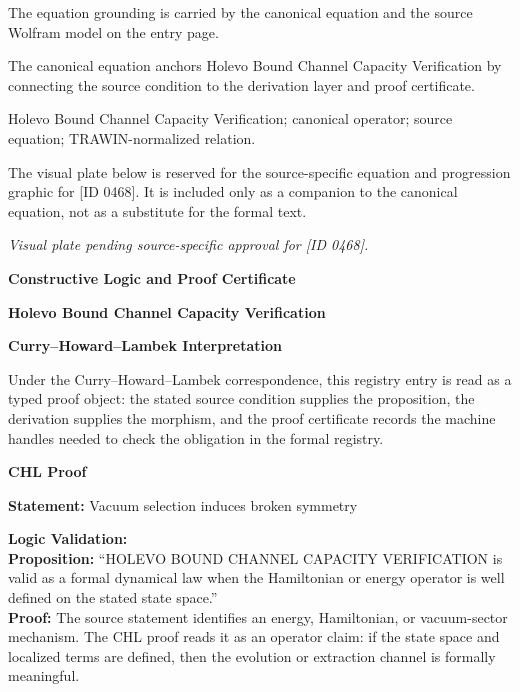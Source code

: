 The equation grounding is carried by the canonical equation and the source Wolfram model on the entry page.

The canonical equation anchors Holevo Bound Channel Capacity Verification by connecting the source condition to the derivation layer and proof certificate.

Holevo Bound Channel Capacity Verification; canonical operator; source equation; TRAWIN-normalized relation.
\endgroup

\begingroup\footnotesize\sloppy
The visual plate below is reserved for the source-specific equation and progression graphic for [ID 0468]. It is included only as a companion to the canonical equation, not as a substitute for the formal text.
\par\endgroup
\begingroup\footnotesize\itshape
Visual plate pending source-specific approval for [ID 0468].
\par\endgroup

\clearpage
\begingroup\tzpsupportsetup
\noindent\textbf{\fontsize{10.8pt}{12.8pt}\selectfont [ID 0468] Constructive Logic and Proof Certificate}\par
\noindent\textbf{\fontsize{10pt}{12pt}\selectfont Holevo Bound Channel Capacity Verification}\par
\vspace{0.45em}
\begingroup
\footnotesize
\setlength{\parskip}{0.22em}
\setlength{\parindent}{0pt}
\noindent\textbf{Curry--Howard--Lambek Interpretation}\par
Under the Curry--Howard--Lambek correspondence, this registry entry is read as a typed proof
object: the stated source condition supplies the proposition, the derivation supplies the
morphism, and the proof certificate records the machine handles needed to check the obligation
in the formal registry.

\vspace{0.45em}
\noindent\textbf{CHL Proof}\par
\textbf{Statement:} Vacuum selection induces broken symmetry

\textbf{Logic Validation:}\\
\textbf{Proposition:} ``HOLEVO BOUND CHANNEL CAPACITY VERIFICATION is valid as a formal dynamical law when the
Hamiltonian or energy operator is well defined on the stated state space.''\\
\textbf{Proof:} The source statement identifies an energy, Hamiltonian, or vacuum-sector mechanism. The
CHL proof reads it as an operator claim: if the state space and localized terms are
defined, then the evolution or extraction channel is formally meaningful.

